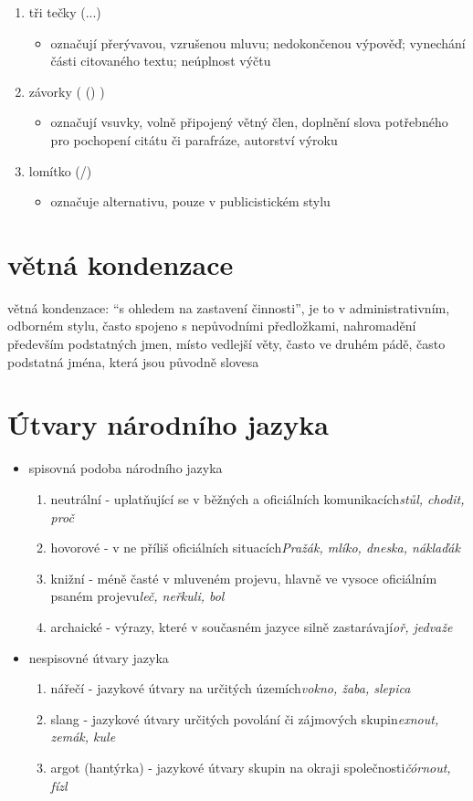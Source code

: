 \documentclass{memoir}
\begin{document}
\begin{enumerate}
\begin{itemize}
		\end{itemize}
		\item tři tečky (...)
		\begin{itemize}
			\item označují přerývavou, vzrušenou mluvu; nedokončenou výpověď; vynechání části citovaného textu; neúplnost výčtu
		\end{itemize}		
		\item závorky ( () )
		\begin{itemize}
			\item označují vsuvky, volně připojený větný člen, doplnění slova potřebného pro pochopení citátu či parafráze, autorství výroku
		\end{itemize}
		\item lomítko (/)
		\begin{itemize}
			\item označuje alternativu, pouze v publicistickém stylu 
		\end{itemize}
	\end{enumerate}

\section*{větná kondenzace}
větná kondenzace: “s ohledem na zastavení činnosti”, je to v administrativním, odborném stylu, často spojeno s nepůvodními předložkami, nahromadění především podstatných jmen, místo vedlejší věty, často ve druhém pádě, často podstatná jména, která jsou původně slovesa

\section*{Útvary národního jazyka}
	\begin{itemize}
		\item spisovná podoba národního jazyka
		\begin{enumerate}
			\item neutrální - uplatňující se v běžných a oficiálních komunikacích\hfill\textit{stůl, chodit, proč}
			\item hovorové - v ne příliš oficiálních situacích\hfill\textit{Pražák, mlíko, dneska, náklaďák}
			\item knižní - méně časté v mluveném projevu, hlavně ve vysoce oficiálním psaném projevu\hfill\textit{leč, neřkuli, bol}
			\item archaické - výrazy, které v současném jazyce silně zastarávají\hfill\textit{oř, jedvaže}
		\end{enumerate}
		\item nespisovné útvary jazyka
		\begin{enumerate}
			\item nářečí - jazykové útvary na určitých územích\hfill\textit{vokno, žaba, slepica}
			\item slang - jazykové útvary určitých povolání či zájmových skupin\hfill\textit{exnout, zemák, kule}
			\item argot (hantýrka) - jazykové útvary skupin na okraji společnosti\hfill\textit{čórnout, fízl}
		\end{enumerate}
	\end{itemize}
\end{document}
